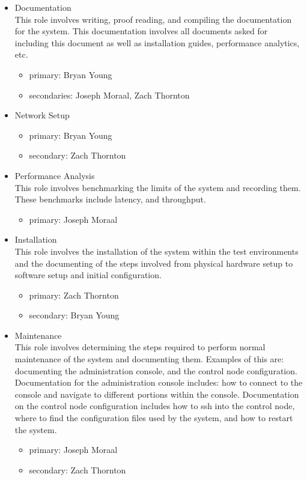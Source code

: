 \documentclass[11pt,a4paper]{article}
\begin{document}
\begin{itemize}
\begin{itemize}
    \end{itemize}
    \item{Documentation} \\
    This role involves writing, proof reading, and compiling the documentation for the system.  This documentation involves all documents asked for including this document as well as installation guides, performance analytics, etc.
    \begin{itemize}
        \item{primary: Bryan Young}
        \item{secondaries: Joseph Moraal, Zach Thornton}
    \end{itemize}
    \item{Network Setup}
    \begin{itemize}
        \item{primary: Bryan Young}
        \item{secondary: Zach Thornton}
    \end{itemize}
    \item{Performance Analysis} \\
    This role involves benchmarking the limits of the system and recording them.  These benchmarks include latency, and throughput. 
    \begin{itemize}
        \item{primary: Joseph Moraal}
    \end{itemize}
    \item{Installation} \\
    This role involves the installation of the system within the test environments and the documenting of the steps involved from physical hardware setup to software setup and initial configuration.
    \begin{itemize}
        \item{primary: Zach Thornton}
        \item{secondary: Bryan Young}
    \end{itemize}
    \item{Maintenance} \\
    This role involves determining the steps required to perform normal maintenance of the system and documenting them.  Examples of this are: documenting the administration console, and the control node configuration.  Documentation for the administration console includes: how to connect to the console and navigate to different portions within the console.  Documentation on the control node configuration includes how to ssh into the control node, where to find the configuration files used by the system, and how to restart the system.
    \begin{itemize}
        \item{primary: Joseph Moraal}
        \item{secondary: Zach Thornton}
    \end{itemize}
\end{itemize}
\end{document}
